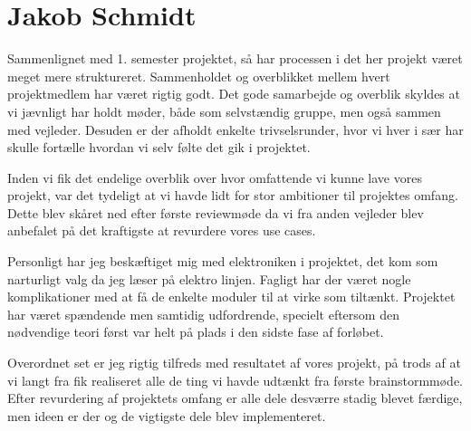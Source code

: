 \section{Jakob Schmidt}
Sammenlignet med 1. semester projektet, så har processen i det her projekt været meget mere struktureret. Sammenholdet og overblikket mellem hvert projektmedlem har været rigtig godt. Det gode samarbejde og overblik skyldes at vi jævnligt har holdt møder, både som selvstændig gruppe, men også sammen med vejleder. Desuden er der afholdt enkelte trivselsrunder, hvor vi hver i sær har skulle fortælle hvordan vi selv følte det gik i projektet. 

Inden vi fik det endelige overblik over hvor omfattende vi kunne lave vores projekt, var det tydeligt at vi havde lidt for stor ambitioner til projektes omfang. Dette blev skåret ned efter første reviewmøde da vi fra anden vejleder blev anbefalet på det kraftigste at revurdere vores use cases.

Personligt har jeg beskæftiget mig med elektroniken i projektet, det kom som narturligt valg da jeg læser på elektro linjen. Fagligt har der været nogle komplikationer med at få de enkelte moduler til at virke som tiltænkt. Projektet har været spændende men samtidig udfordrende, specielt eftersom den nødvendige teori først var helt på plads i den sidste fase af forløbet.  

Overordnet set er jeg rigtig tilfreds med resultatet af vores projekt, på trods af at vi langt fra fik realiseret alle de ting vi havde udtænkt fra første brainstormmøde. Efter revurdering af projektets omfang er alle dele desværre stadig blevet færdige, men ideen er der og de vigtigste dele blev implementeret. 